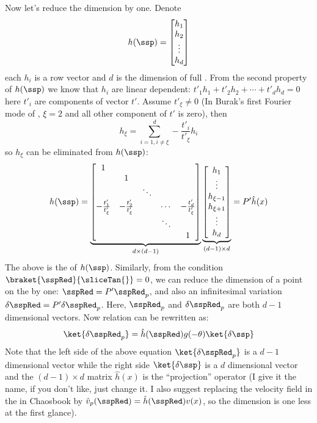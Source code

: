 Now let's reduce the dimension by one. Denote
\[
h(\ssp)=
\begin{bmatrix}
  h_{1} \\
  h_{2} \\
  \vdots \\
  h_{d} \\
\end{bmatrix}
\]
each $h_{i}$ is a row vector and $d$ is the dimension of full {\statesp}.
From the second property of $h(\ssp)$ we know that $h_{i}$ are linear
dependent: $t'_{1}h_{1}+t'_{2}h_{2}+\cdots +t'_{d}h_{d}=0$ here $t'_{i}$ are
components of vector $t'$. Assume $t'_{\xi}\neq 0$ (In Burak's first Fourier mode
{\slice} of \KSe, $\xi=2$ and all other component of $t'$ is zero), then
\[
h_{\xi}=\sum_{i=1,i\neq \xi}^{d}-\frac{t'_{i}}{t'_{\xi}}h_{i}
\]
so $h_{\xi}$ can be eliminated from $h(\ssp)$:
\[
h(\ssp)=
\underbrace{
\begin{bmatrix}
 1 & & & & \\
 & 1 & & & \\
 & & \ddots & & \\
 -\frac{t'_{1}}{t'_{\xi}} & -\frac{t'_{2}}{t'_{\xi}} & & \cdots & -\frac{t'_{d}}{t'_{\xi}} \\
 & & & \ddots  & \\
 & & & & 1 \\
\end{bmatrix}
}_{d\times (d-1)}
\underbrace{
\begin{bmatrix}
  h_{1} \\
  \vdots \\
  h_{\xi-1} \\
  h_{\xi+1} \\
  \vdots \\
  h_{d} \\
\end{bmatrix}
}_{(d-1)\times d}
=P'\hat{h}(x)
\]
The above is the
of $h(\ssp)$. Similarly, from the {\slice} condition $\braket{\sspRed}{\sliceTan{}}=0$, we can reduce the dimension of a
point on the {\slice} by one: $\sspRed=P'\sspRed_{p}$, and also an infinitesimal
variation $\delta \sspRed=P'\delta \sspRed_{p}$. Here, $\sspRed_{p}$ and
$\delta \sspRed_{p}$ are both $d-1$ dimensional vectors.
Now relation  can be rewritten as:
\begin{equation}
  \label{eq:projectionReduced}
  \ket{\delta \sspRed_{p}}=\hat{h}(\sspRed)g(-\theta)\ket{\delta \ssp}
\end{equation}
Note that the left side of the above equation $\ket{\delta \sspRed_{p}}$
is a $d-1$ dimensional vector while the right side $\ket{\delta \ssp}$
is a $d$ dimensional vector and the $(d-1)\times d$ matrix $\hat{h}(x)$
is the ``projection'' operator (I give it the name, if you don't like,
just change it. I also suggest replacing the velocity field in the {\slice}
in Chaosbook by $\hat{v}_{p}(\sspRed)=\hat{h}(\sspRed)v(x)$, so
the dimension is one less at the first glance).

